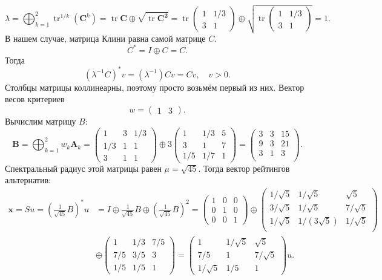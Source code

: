 \documentclass[specialist,
  substylefile = spbu.rtx,
  href,
  colorlinks=true,
  12pt]{disser}
\begin{document}
	\[
	\lambda=\bigoplus_{k=1}^{2} \operatorname{tr}^{1 / k}\left(\boldsymbol{C}^{k}\right) = \operatorname{tr}\boldsymbol{C} \oplus \sqrt{\operatorname{tr}\boldsymbol{C^2}} =
	\operatorname{tr}\begin{pmatrix}1&1/3\\3&1\end{pmatrix} \oplus \sqrt{\operatorname{tr}\begin{pmatrix}1&1/3\\3&1\end{pmatrix}} = 1.
	\]
	В нашем случае, матрица Клини равна самой матрице \(C\).
	\[
	C^* = I \oplus C = C.
	\]
	Тогда
	\[
	(\lambda^{-1}C)^*v = (\lambda^{-1})Cv = Cv, \quad v > 0.
	\]
	Столбцы матрицы коллинеарны, поэтому просто возьмём первый из них. Вектор весов критериев
	\[
	w = \begin{pmatrix}1 & 3\end{pmatrix}.
	\]
	Вычислим матрицу \(B\):
	\[
	\boldsymbol{B}=\bigoplus_{k=1}^{2} w_{k} \boldsymbol{A}_{k} = \begin{pmatrix}1&3&1/3\\1/3&1&1\\3&1&1\end{pmatrix} \oplus 3\begin{pmatrix}1&1/3&5\\3&1&7\\1/5&1/7&1\end{pmatrix} = \begin{pmatrix}3&3&15\\ 9&3&21\\ 3&1&3\\\end{pmatrix}.
	\]
	Спектральный радиус этой матрицы равен \(\mu = \sqrt{45}\).
	Тогда вектор рейтингов альтернатив:
	\begin{align*}
		\boldsymbol{x} = Su = \left(\frac{1}{\sqrt{45}}B\right)^*u &=
		I \oplus \frac{1}{\sqrt{45}} B \oplus (\frac{1}{\sqrt{45}} B)^2 =
		\begin{pmatrix}1& 0& 0\\0& 1& 0\\0& 0& 1\end{pmatrix}
		\oplus
		\begin{pmatrix}
			1/\sqrt{5} & 1/\sqrt{5}   & \sqrt{5} \\
			3/\sqrt{5} & 1/\sqrt{5}   & 7/\sqrt{5} \\
			1/\sqrt{5} & 1/(3 \sqrt{5}) & 1/\sqrt{5} \\
		\end{pmatrix}\\
		&\oplus
		\begin{pmatrix}1& 1/3& 7/5\\7/5& 3/5& 3\\1/5& 1/5& 1\end{pmatrix} =
		\begin{pmatrix} 1&1/\sqrt{5}&\sqrt{5}\\ 7/5&1&7/\sqrt{5}\\ 1/\sqrt{5}&1/5&1 \end{pmatrix}u.
	\end{align*}
	
\end{document}
